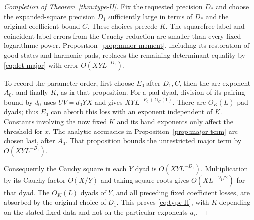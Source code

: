 \begin{proof}[Completion of Theorem~\ref{thm:type-II}]
Fix the requested precision $D_*$ and choose the expanded-square
precision $D_1$ sufficiently large in terms of $D_*$ and the
original coefficient bound $C$.  These choices precede $K$.
The squarefree-label and coincident-label errors from the Cauchy
reduction are smaller than every fixed logarithmic power.
Proposition~\ref{prop:minor-moment}, including its restoration of
good states and harmonic pads, replaces the remaining determinant
equality by \eqref{eq:det-major} with error
$O(XYL^{-D_1})$.

To record the parameter order, first choose $E_0$ after $D_1,C$,
then the arc exponent $A_0$, and finally $K$, as in that
proposition.  For a pad dyad, division of its pairing bound by
$d_0$ uses $UV=d_0YX$ and gives
$XYL^{-E_0+O_C(1)}$.  There are $O_K(L)$ pad dyads; thus $E_0$
can absorb this loss with an exponent independent of $K$.
Constants involving the now fixed $K$ and its band exponents only
affect the threshold for $x$.
The analytic accuracies in Proposition~\ref{prop:major-term} are
chosen last, after $A_0$.  That proposition bounds the unrestricted
major term by $O(XYL^{-D_1})$.

Consequently the Cauchy square in each $Y$ dyad is
$O(XYL^{-D_1})$.  Multiplication by its Cauchy factor $O(X/Y)$
and taking square roots gives $O(XL^{-D_1/2})$ for that dyad.
The $O_K(L)$ dyads of $Y$, and all preceding fixed coefficient
losses, are absorbed by the original choice of $D_1$.
This proves \eqref{eq:type-II}, with $K$ depending on the stated
fixed data and not on the particular exponents $a_i$.
\end{proof}
